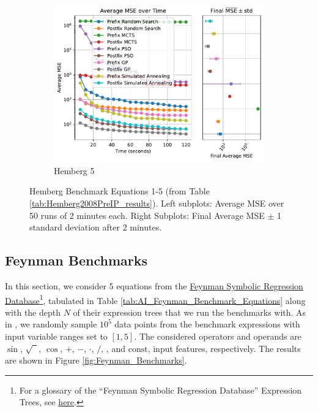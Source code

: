 \documentclass[runningheads]{llncs}
\newcommand\specialcaret{%
  \stackengine{0pt}{\ \,}{\scalebox{1.1}[2]{\raisebox{-0.9ex}{\string^}}}{O}{c}{F}{T}{L}}
\begin{document}
\begin{figure}
    \vspace{0.4cm}
    \begin{subfigure}[b]{0.49\textwidth}
        \includegraphics[width=\linewidth, keepaspectratio]{Hemberg_Benchmarks/Hemberg_Benchmark_5.pdf}
        \caption{Hemberg 5}
        \label{subfig:hemberg_5}
    \end{subfigure}
    
    \caption{Hemberg Benchmark Equations 1-5 (from Table \ref{tab:Hemberg2008PreIP_results}). Left subplots: Average MSE over 50 runs of 2 minutes each. Right Subplots: Final Average MSE $\pm$ 1 standard deviation after 2 minutes.}
    \label{fig:Hemberg_Benchmarks}
\end{figure}

\subsection{Feynman Benchmarks} \label{subsec:FeynmanBenchmarks}
In this section, we consider 5 equations from the \href{https://space.mit.edu/home/tegmark/aifeynman.html}{Feynman Symbolic Regression Database}\footnote{For a glossary of the ``Feynman Symbolic Regression Database'' Expression Trees, see \href{https://edfink234.github.io/AIFeynmanExpressionTrees/AIFeynmanExpressionTrees/AIFeynmanExpressionTrees}{here}.}, tabulated in Table \ref{tab:AI_Feynman_Benchmark_Equations} along with the depth $N$ of their expression trees that we run the benchmarks with. As in \cite{udrescu2020ai}, we randomly sample $10^5$ data points from the benchmark expressions with input variable ranges set to $[1, 5]$. The considered operators and operands are $\sin$, $\sqrt{\phantom{1}}$, $\cos$, $+$, $-$, $\cdot$, $/$, \specialcaret, and $\mathrm{const}$, input features, respectively. The results are shown in Figure \ref{fig:Feynman_Benchmarks}.
\end{document}
